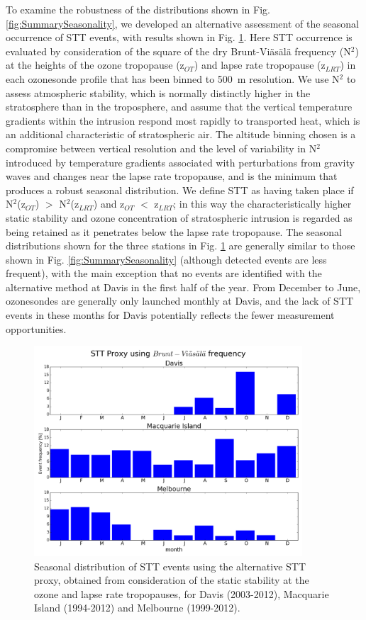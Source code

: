 \documentclass[acp, manuscript]{copernicus} %
\begin{document}
  To examine the robustness of the distributions shown in Fig. \ref{fig:SummarySeasonality}, we developed an alternative assessment of the seasonal occurrence of STT events, with results shown in Fig. \ref{fig:AndrewProxySTT}.
  Here STT occurrence is evaluated by consideration of the square of the dry Brunt-Viäsälä frequency (N$^2$) at the heights of the ozone tropopause (z$_{OT}$) and lapse rate tropopause (z$_{LRT}$) in each ozonesonde profile that has been binned to 500~m resolution.
  We use N$^2$ to assess atmospheric stability, which is normally distinctly higher in the stratosphere than in the troposphere, and assume that the vertical temperature gradients within the intrusion respond most rapidly to transported heat, which is an additional characteristic of stratospheric air.
  The altitude binning chosen is a compromise between vertical resolution and the level of variability in N$^2$ introduced by temperature gradients associated with perturbations from gravity waves and changes near the lapse rate tropopause, and is the minimum that produces a robust seasonal distribution.
  We define STT as having taken place if N$^2$(z$_{OT}$) $>$ N$^2$(z$_{LRT}$) and z$_{OT}$ $<$ z$_{LRT}$; in this way the characteristically higher static stability and ozone concentration of stratospheric intrusion is regarded as being retained as it penetrates below the lapse rate tropopause. 
  The seasonal distributions shown for the three stations in Fig. \ref{fig:AndrewProxySTT} are generally similar to those shown in Fig. \ref{fig:SummarySeasonality} (although detected events are less frequent), with the main exception that no events are identified with the alternative method at Davis in the first half of the year.
  From December to June, ozonesondes are generally only launched monthly at Davis, and the lack of STT events in these months for Davis potentially reflects the fewer measurement opportunities.

  \begin{figure}[t]
    \includegraphics[width=10cm]{figures/AndrewProxySTT.png}
    \caption{Seasonal distribution of STT events using the alternative STT proxy, obtained from consideration of the static stability at the ozone and lapse rate tropopauses, for Davis (2003-2012), Macquarie Island (1994-2012) and Melbourne (1999-2012).}
    \label{fig:AndrewProxySTT}

  \end{figure}
\end{document}
